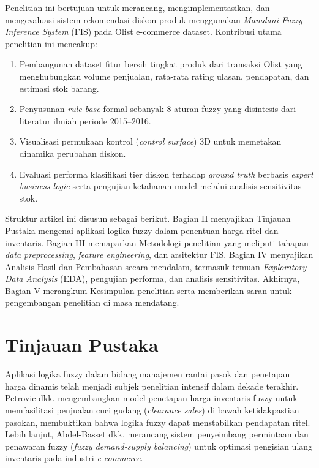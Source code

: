 \documentclass[conference]{IEEEtran}
\begin{document}
Penelitian ini bertujuan untuk merancang, mengimplementasikan, dan mengevaluasi sistem rekomendasi diskon produk menggunakan \textit{Mamdani Fuzzy Inference System} (FIS) pada Olist e-commerce dataset. Kontribusi utama penelitian ini mencakup:
\begin{enumerate}
    \item Pembangunan dataset fitur bersih tingkat produk dari transaksi Olist yang menghubungkan volume penjualan, rata-rata rating ulasan, pendapatan, dan estimasi stok barang.
    \item Penyusunan \textit{rule base} formal sebanyak 8 aturan fuzzy yang disintesis dari literatur ilmiah periode 2015--2016.
    \item Visualisasi permukaan kontrol (\textit{control surface}) 3D untuk memetakan dinamika perubahan diskon.
    \item Evaluasi performa klasifikasi tier diskon terhadap \textit{ground truth} berbasis \textit{expert business logic} serta pengujian ketahanan model melalui analisis sensitivitas stok.
\end{enumerate}

Struktur artikel ini disusun sebagai berikut. Bagian II menyajikan Tinjauan Pustaka mengenai aplikasi logika fuzzy dalam penentuan harga ritel dan inventaris. Bagian III memaparkan Metodologi penelitian yang meliputi tahapan \textit{data preprocessing}, \textit{feature engineering}, dan arsitektur FIS. Bagian IV menyajikan Analisis Hasil dan Pembahasan secara mendalam, termasuk temuan \textit{Exploratory Data Analysis} (EDA), pengujian performa, dan analisis sensitivitas. Akhirnya, Bagian V merangkum Kesimpulan penelitian serta memberikan saran untuk pengembangan penelitian di masa mendatang.

\section{Tinjauan Pustaka}
Aplikasi logika fuzzy dalam bidang manajemen rantai pasok dan penetapan harga dinamis telah menjadi subjek penelitian intensif dalam dekade terakhir. Petrovic dkk. \cite{petrovic2019} mengembangkan model penetapan harga inventaris fuzzy untuk memfasilitasi penjualan cuci gudang (\textit{clearance sales}) di bawah ketidakpastian pasokan, membuktikan bahwa logika fuzzy dapat menstabilkan pendapatan ritel. Lebih lanjut, Abdel-Basset dkk. \cite{abdelbasset2021} merancang sistem penyeimbang permintaan dan penawaran fuzzy (\textit{fuzzy demand-supply balancing}) untuk optimasi pengisian ulang inventaris pada industri \textit{e-commerce}.
\end{document}
